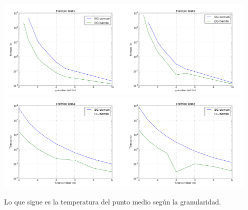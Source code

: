 \documentclass[a4paper]{article}
\begin{document}
\noindent \includegraphics[width=180pt]{img/tiempo1.png}\includegraphics[width=180pt]{img/tiempo2.png} \newline
\includegraphics[width=180pt]{img/tiempo3.png}\includegraphics[width=180pt]{img/tiempo4.png} 

Lo que sigue es la temperatura del punto medio según la granularidad. 
\end{document}
